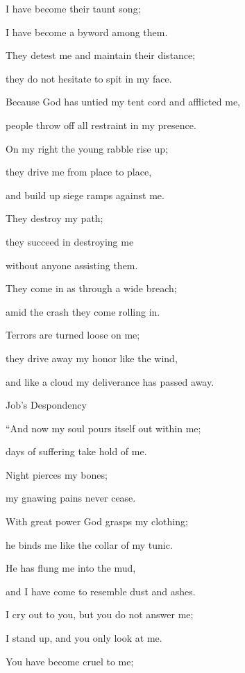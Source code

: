 {I have become their taunt song;
\par }{\Q I have become
a byword
among them.
\par }{\Q {}They detest
me
and maintain their distance;
\par }{\Q they do not
hesitate
to spit
in my face.
\par }{\Q {}Because
God has untied
my tent cord
and afflicted
me,
\par }{\Q people throw off
all restraint
in my presence.
\par }{\Q {}On
my right
the young rabble
rise up;
\par }{\Q they drive
me from place to place,
\par }{\Q and build up
siege ramps
against me.
\par }{\Q {}They destroy my path;
\par }{\Q they succeed in destroying me
\par }{\Q without
anyone assisting them.
\par }{\Q {}They come
in as through a wide
breach;
\par }{\Q amid
the crash
they come rolling in.
\par }{\Q {}Terrors
are turned
loose on
me;
\par }{\Q they drive
away my honor
like the wind,
\par }{\Q and like a cloud
my deliverance
has passed away.
\par }{\SH Job’s Despondency
\par }{\Q {}“And now
my soul
pours
itself out within me;

\par }{\Q days
of suffering
take hold of me.
\par }{\Q {}Night
pierces my bones;
\par }{\Q my gnawing
pains never cease.
\par }{\Q {}With great
power
God grasps
my clothing;
\par }{\Q he binds
me like the collar
of my tunic.
\par }{\Q {}He
has flung
me into the mud,
\par }{\Q and I have come to resemble
dust
and ashes.
\par }{\Q {}I cry out
to
you, but you do not
answer
me;
\par }{\Q I stand
up, and you only
look at me.
\par }{\Q {}You have become
cruel
to me;

}
